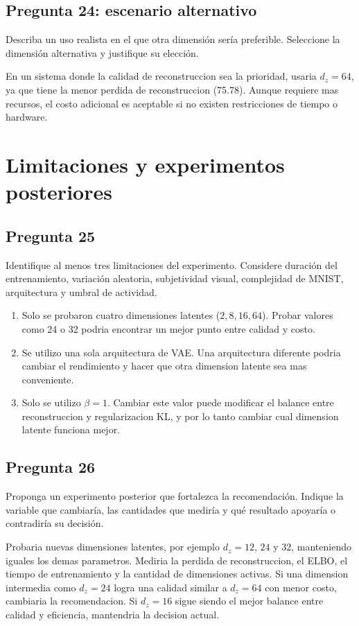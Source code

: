 \documentclass[11pt,letterpaper]{article}
\begin{document}
\subsection*{Pregunta 24: escenario alternativo}
Describa un uso realista en el que otra dimensión sería preferible. Seleccione
la dimensión alternativa y justifique su elección.
\begin{responsebox}
En un sistema donde la calidad de reconstruccion sea la prioridad, usaria $d_z=64$, ya que tiene la menor perdida de reconstruccion (75.78). Aunque requiere mas recursos, el costo adicional es aceptable si no existen restricciones de tiempo o hardware.
\end{responsebox}

\section{Limitaciones y experimentos posteriores}

\subsection*{Pregunta 25}
Identifique al menos tres limitaciones del experimento. Considere duración del
entrenamiento, variación aleatoria, subjetividad visual, complejidad de MNIST,
arquitectura y umbral de actividad.
\begin{responsebox}
\begin{enumerate}
    \item Solo se probaron cuatro dimensiones latentes ($2, 8, 16, 64$). Probar valores como 24 o 32 podria encontrar un mejor punto entre calidad y costo.

    \item Se utilizo una sola arquitectura de VAE. Una arquitectura diferente podria cambiar el rendimiento y hacer que otra dimension latente sea mas conveniente.

    \item Solo se utilizo $\beta=1$. Cambiar este valor puede modificar el balance entre reconstruccion y regularizacion KL, y por lo tanto cambiar cual dimension latente funciona mejor.
\end{enumerate}
\end{responsebox}

\subsection*{Pregunta 26}
Proponga un experimento posterior que fortalezca la recomendación. Indique la
variable que cambiaría, las cantidades que mediría y qué resultado apoyaría o
contradiría su decisión.
\begin{responsebox}
Probaria nuevas dimensiones latentes, por ejemplo $d_z=12$, $24$ y $32$, manteniendo iguales los demas parametros. Mediria la perdida de reconstruccion, el ELBO, el tiempo de entrenamiento y la cantidad de dimensiones activas. Si una dimension intermedia como $d_z=24$ logra una calidad similar a $d_z=64$ con menor costo, cambiaria la recomendacion. Si $d_z=16$ sigue siendo el mejor balance entre calidad y eficiencia, mantendria la decision actual.
\end{responsebox}
\end{document}
